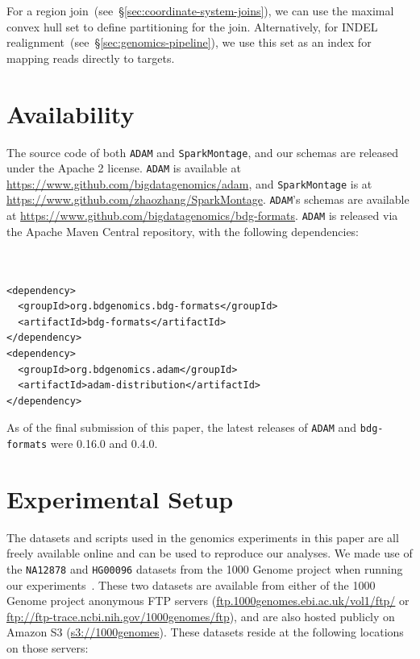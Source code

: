 \documentclass{sig-alternate}
\begin{document}
For a region join~(see~\S\ref{sec:coordinate-system-joins}), we can use the maximal convex hull
set to define partitioning for the join. Alternatively, for INDEL realignment~(see~\S\ref{sec:genomics-pipeline}),
we use this set as an index for mapping reads directly to targets.

\section{Availability}
\label{sec:availability}

The source code of both \texttt{ADAM} and \texttt{SparkMontage}, and our schemas are released under the Apache 2
license. \texttt{ADAM} is available at \url{https://www.github.com/bigdatagenomics/adam}, and \texttt{SparkMontage}
is at \url{https://www.github.com/zhaozhang/SparkMontage}. \texttt{ADAM}'s schemas are available at
\url{https://www.github.com/bigdatagenomics/bdg-formats}. \linebreak \texttt{ADAM} is released via the Apache Maven
Central repository, with the following dependencies:

\begin{verbatim}


<dependency>
  <groupId>org.bdgenomics.bdg-formats</groupId>
  <artifactId>bdg-formats</artifactId>
</dependency>
<dependency>
  <groupId>org.bdgenomics.adam</groupId>
  <artifactId>adam-distribution</artifactId>
</dependency>
\end{verbatim}

As of the final submission of this paper, the latest releases of \texttt{ADAM} and \texttt{bdg-formats} were 0.16.0 and 0.4.0.

\section{Experimental Setup}
\label{sec:experimental-setup}

The datasets and scripts used in the genomics experiments in this paper are all freely available online
and can be used to reproduce our analyses. We made use of the \texttt{NA12878} and \texttt{HG00096}
datasets from the 1000 Genome project when running our experiments~\cite{siva08}. These two datasets
are available from either of the 1000 Genome project anonymous FTP servers
(\url{ftp.1000genomes.ebi.ac.uk/vol1/ftp/} or \url{ftp://ftp-trace.ncbi.nih.gov/1000genomes/ftp}), and are
also hosted publicly on Amazon S3 (\url{s3://1000genomes}). These datasets reside at the following
locations on those servers:
\end{document}
